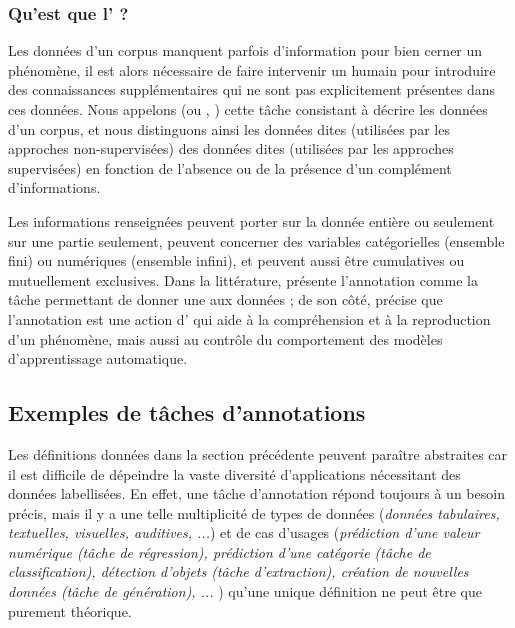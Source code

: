 		\subsubsection{Qu'est que l' ?}
		\label{section:2.1.1.C-PRESENTATION-ANNOTATION-DEFINITION-ANNOTATION}
			
			Les données d'un corpus manquent parfois d'information pour bien cerner un phénomène, il est alors nécessaire de faire intervenir un humain pour introduire des connaissances supplémentaires qui ne sont pas explicitement présentes dans ces données.
			Nous appelons  (ou , ) cette tâche consistant à décrire les données d'un corpus, et nous distinguons ainsi les données dites  (utilisées par les approches non-supervisées) des données dites  (utilisées par les approches supervisées) en fonction de l'absence ou de la présence d'un complément d'informations.
			
			Les informations renseignées peuvent porter sur la donnée entière ou seulement sur une partie seulement, peuvent concerner des variables catégorielles (ensemble fini) ou numériques (ensemble infini), et peuvent aussi être cumulatives ou mutuellement exclusives.
			Dans la littérature, \cite{garside-etal:1997:corpus-annotation-linguistic} présente l'annotation comme la tâche permettant de donner une  aux données ; de son côté, \cite{leech:2004:adding-linguistic-annotation} précise que l'annotation est une action d' qui aide à la compréhension et à la reproduction d'un phénomène, mais aussi au contrôle du comportement des modèles d'apprentissage automatique.
	
	
	\subsection{Exemples de tâches d'annotations}
	\label{section:2.1.2-PRESENTATION-ANNOTATION-EXEMPLES}
		
		Les définitions données dans la section précédente peuvent paraître abstraites car il est difficile de dépeindre la vaste diversité d'applications nécessitant des données labellisées.
		En effet, une tâche d'annotation répond toujours à un besoin précis, mais il y a une telle multiplicité de types de données (\textit{données tabulaires, textuelles, visuelles, auditives, ...}) et de cas d'usages (\textit{prédiction d'une valeur numérique (tâche de régression), prédiction d'une catégorie (tâche de classification), détection d'objets (tâche d'extraction), création de nouvelles données (tâche de génération), ... }) qu'une unique définition ne peut être que purement théorique.
		
